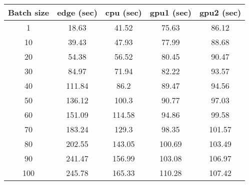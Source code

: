 \scriptsize

\begin{tabular}{|c|c|c|c|c|} 
\hline
\textbf{Batch size }& \textbf{edge} (sec) & \textbf{cpu} (sec) & \textbf{gpu1} (sec) & \textbf{gpu2} (sec) \\
\hline
1 & 18.63 & 41.52 & 75.63 & 86.12 \\
\hline
10 & 39.43 & 47.93 & 77.99 & 88.68 \\
\hline
20 & 54.38 & 56.52 & 80.45 & 90.47 \\
\hline
30 & 84.97 & 71.94 & 82.22 & 93.57 \\
\hline
40 & 111.84 & 86.2 & 89.47 & 94.56 \\
\hline
50 & 136.12 & 100.3 & 90.77 & 97.03 \\
\hline
60 & 151.09 & 114.58 & 94.86 & 99.58 \\
\hline
70 & 183.24 & 129.3 & 98.35 & 101.57 \\
\hline
80 & 202.55 & 143.05 & 100.69 & 103.49 \\
\hline
90 & 241.47 & 156.99 & 103.08 & 106.97 \\
\hline
100 & 245.78 & 165.33 & 110.28 & 107.42 \\
\hline
\end{tabular}
